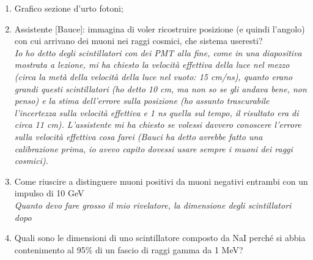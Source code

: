 \documentclass[../main.tex]{subfiles}
\begin{document}
\begin{enumerate}
    \item Grafico sezione d'urto fotoni;
    \item Assistente [Bauce]: immagina di voler ricostruire posizione (e quindi l'angolo) con cui arrivano dei muoni nei raggi cosmici, che sistema useresti?\\ 
{\it Io ho detto degli scintillatori con dei PMT alla fine, come in una diapositiva mostrata a lezione, mi ha chiesto la velocità effettiva della luce nel mezzo (circa la metà della velocità della luce nel vuoto: 15 cm/ns), quanto erano grandi questi scintillatori (ho detto 10 cm, ma non so se gli andava bene, non penso) e la stima dell'errore sulla posizione (ho assunto trascurabile l'incertezza sulla velocità effettiva e 1 ns quella sul tempo, il risultato era di circa 11 cm). L'assistente mi ha chiesto se volessi davvero conoscere l'errore sulla velocità effettiva cosa farei (Bauci ha detto avrebbe fatto una calibrazione prima, io avevo capito dovessi usare sempre i muoni dei raggi cosmici).}
   \item Come riuscire a distinguere muoni positivi da muoni negativi entrambi con un impulso di 10 GeV\\
    \textit{Quanto devo fare grosso il mio rivelatore, la dimensione degli scintillatori dopo}
    \item Quali sono le dimensioni di uno scintillatore composto da NaI perché si abbia contenimento al 95\% di un fascio di raggi gamma da 1 MeV?
\end{enumerate}
\end{document}
